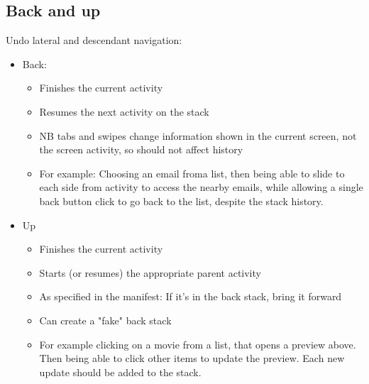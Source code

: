 \documentclass{article}
\begin{document}
\subsection{Back and up}

Undo lateral and descendant navigation:
\begin{itemize}
  \item Back:
  \begin{itemize}
    \item Finishes the current activity
    \item Resumes the next activity on the stack
    \item NB tabs and swipes change information shown in the current screen, not the screen activity, so should not affect history
    \item For example: Choosing an email froma list, then being able to slide to each side from activity to access the nearby emails, while allowing a single back button click to go back to the list, despite the stack history.
  \end{itemize}
  \item Up
  \begin{itemize}
    \item Finishes the current activity
    \item Starts (or resumes) the appropriate parent activity
    \item As specified in the manifest: If it’s in the back stack, bring it forward
    \item Can create a "fake" back stack
    \item For example clicking on a movie from a list, that opens a preview above. Then being able to click other items to update the preview. Each new update should be added to the stack.
  \end{itemize}
\end{itemize}
\end{document}
